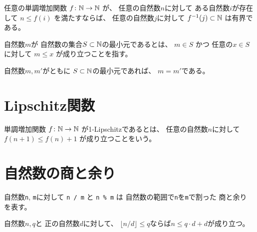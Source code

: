 \begin{lemma}
\label{lm:finite_of_bounded_of_Nat}
\leanok
{}
\end{lemma}

\begin{lemma}
\label{lm:fib_monotone_ubd_fun_bdd}
\leanok
任意の単調増加関数
$
f \colon \mathbb{N} \to \mathbb{N}
$
が、
任意の自然数$n$に対して
ある自然数$i$が存在して
$
n \le f(i)
$
を満たすならば、
任意の自然数$j$に対して
$
f^{-1}(j) \subset \mathbb{N}
$
は有界である。
\end{lemma}

\begin{definition}
\label{df:IsMinIn}
\leanok
自然数$m$が
自然数の集合$S \subset \mathbb{N}$の最小元であるとは、
$
m \in S
$
かつ
任意の$x \in S$に対して
$
m \le x
$
が成り立つことを指す。
\end{definition}

\begin{lemma}
\label{lm:min_unique}
\leanok
自然数$m, m'$がともに
$S \subset \mathbb{N}$の最小元であれば、
$m = m'$である。
\end{lemma}

\section{Lipschitz関数}

\begin{definition}
\label{df:MonotoneOneLipschitz}
\leanok
単調増加関数
$
f \colon \mathbb{N} \to \mathbb{N}
$
が1-Lipschitzであるとは、
任意の自然数$n$に対して
$
f(n + 1) \le f(n) + 1
$
が成り立つことをいう。
\end{definition}

\section{自然数の商と余り}

自然数\texttt{n}, \texttt{m}に対して
\texttt{n / m}
と
\texttt{n \% m}
は
自然数の範囲で\texttt{n}を\texttt{m}で割った
商と余り
を表す。

\begin{lemma}
\label{lm:nat_div_pnat_le}
\leanok
自然数$n,q$と
正の自然数$d$に対して、
$\lfloor n / d \rfloor \le q$ならば$n \le q \cdot d + d$が成り立つ。
\end{lemma}

